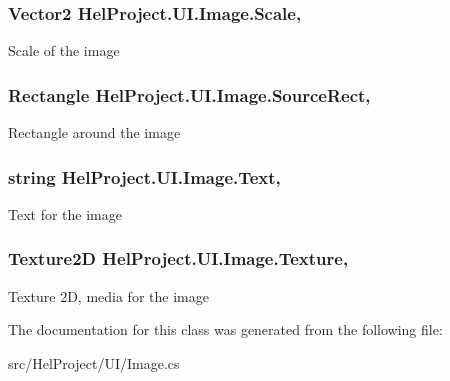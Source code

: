 \subsubsection[{Scale}]{\setlength{\rightskip}{0pt plus 5cm}Vector2 Hel\+Project.\+U\+I.\+Image.\+Scale\hspace{0.3cm}{\ttfamily [get]}, {\ttfamily [set]}}\label{class_hel_project_1_1_u_i_1_1_image_aaee02769150fffb97a56c2883b679054}


Scale of the image 

\hypertarget{class_hel_project_1_1_u_i_1_1_image_a1a24007d692268d32842ec757a5c1c9c}{}
\subsubsection[{Source\+Rect}]{\setlength{\rightskip}{0pt plus 5cm}Rectangle Hel\+Project.\+U\+I.\+Image.\+Source\+Rect\hspace{0.3cm}{\ttfamily [get]}, {\ttfamily [set]}}\label{class_hel_project_1_1_u_i_1_1_image_a1a24007d692268d32842ec757a5c1c9c}


Rectangle around the image 

\hypertarget{class_hel_project_1_1_u_i_1_1_image_a5ee12296f31949495524fba982677dc4}{}
\subsubsection[{Text}]{\setlength{\rightskip}{0pt plus 5cm}string Hel\+Project.\+U\+I.\+Image.\+Text\hspace{0.3cm}{\ttfamily [get]}, {\ttfamily [set]}}\label{class_hel_project_1_1_u_i_1_1_image_a5ee12296f31949495524fba982677dc4}


Text for the image 

\hypertarget{class_hel_project_1_1_u_i_1_1_image_ac8ab89b0c7e2d4475dcfb514b213d783}{}
\subsubsection[{Texture}]{\setlength{\rightskip}{0pt plus 5cm}Texture2\+D Hel\+Project.\+U\+I.\+Image.\+Texture\hspace{0.3cm}{\ttfamily [get]}, {\ttfamily [set]}}\label{class_hel_project_1_1_u_i_1_1_image_ac8ab89b0c7e2d4475dcfb514b213d783}


Texture 2\+D, media for the image 



The documentation for this class was generated from the following file\+:\begin{DoxyCompactItemize}
\item 
src/\+Hel\+Project/\+U\+I/Image.\+cs\end{DoxyCompactItemize}
